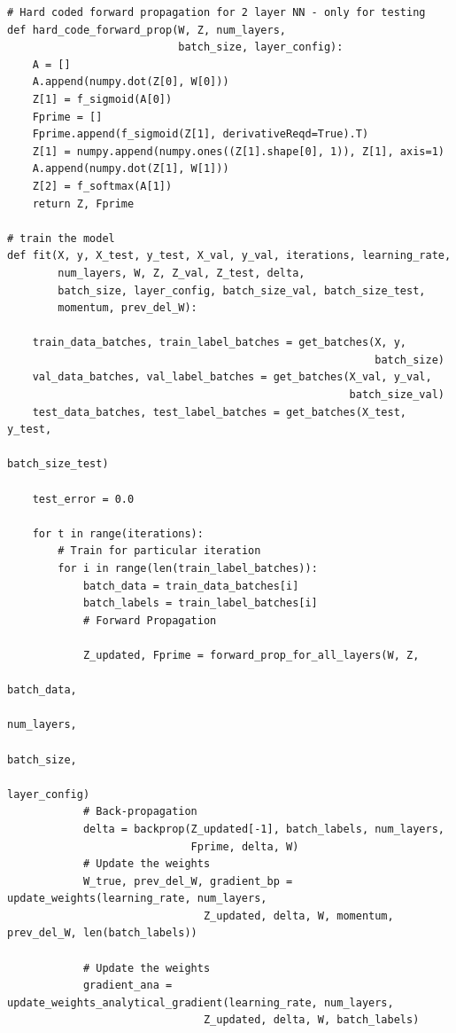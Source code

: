 \documentclass{article}
\begin{document}
\begin{lstlisting}
# Hard coded forward propagation for 2 layer NN - only for testing 
def hard_code_forward_prop(W, Z, num_layers, 
                           batch_size, layer_config):
    A = []
    A.append(numpy.dot(Z[0], W[0]))
    Z[1] = f_sigmoid(A[0])
    Fprime = []
    Fprime.append(f_sigmoid(Z[1], derivativeReqd=True).T)
    Z[1] = numpy.append(numpy.ones((Z[1].shape[0], 1)), Z[1], axis=1)
    A.append(numpy.dot(Z[1], W[1]))
    Z[2] = f_softmax(A[1])
    return Z, Fprime

# train the model
def fit(X, y, X_test, y_test, X_val, y_val, iterations, learning_rate, 
        num_layers, W, Z, Z_val, Z_test, delta,   
        batch_size, layer_config, batch_size_val, batch_size_test,
        momentum, prev_del_W):
            
    train_data_batches, train_label_batches = get_batches(X, y, 
                                                          batch_size)        
    val_data_batches, val_label_batches = get_batches(X_val, y_val, 
                                                      batch_size_val)
    test_data_batches, test_label_batches = get_batches(X_test, y_test, 
                                                       batch_size_test)
    
    test_error = 0.0
    
    for t in range(iterations):
        # Train for particular iteration
        for i in range(len(train_label_batches)):
            batch_data = train_data_batches[i]
            batch_labels = train_label_batches[i]
            # Forward Propagation   
                     
            Z_updated, Fprime = forward_prop_for_all_layers(W, Z,
                                                             batch_data, 
                                                             num_layers, 
                                                             batch_size, 
                                                             layer_config)
            # Back-propagation                                                 
            delta = backprop(Z_updated[-1], batch_labels, num_layers,
                             Fprime, delta, W)
            # Update the weights
            W_true, prev_del_W, gradient_bp = update_weights(learning_rate, num_layers,
                               Z_updated, delta, W, momentum, prev_del_W, len(batch_labels))
            
            # Update the weights
            gradient_ana = update_weights_analytical_gradient(learning_rate, num_layers,
                               Z_updated, delta, W, batch_labels)
            

\end{lstlisting}
\end{document}
